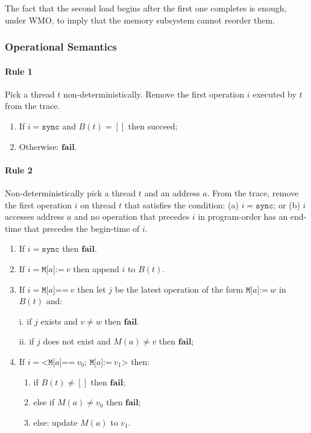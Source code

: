 \documentclass[11pt]{article}
\begin{document}
\noindent The fact that the second load begins after the first one
completes is enough, under WMO, to imply that the memory subsystem
cannot reorder them.

\subsubsection*{Operational Semantics}

\paragraph{Rule 1} 

Pick a thread $t$ non-deterministically.  Remove the first operation
$i$ executed by $t$ from the trace.

\begin{enumerate}
\item
     If $i = \texttt{sync}$ and $B(t) = []$ then succeed;
\item
     Otherwise: $\textbf{fail}$.
\end{enumerate}

\paragraph{Rule 2}

Non-deterministically pick a thread $t$ and an address $a$.  From the
trace, remove the first operation $i$ on thread $t$ that satisfies the
condition: (a) $i = \texttt{sync}$; or (b) $i$ accesses address $a$
and no operation that precedes $i$ in program-order has an end-time
that precedes the begin-time of $i$.

\begin{enumerate}
\item 
     If $i = \texttt{sync}$ then $\textbf{fail}$.

\item 
     If $i = \texttt{M[}a\texttt{]:=}~v$ then append $i$ to $B(t)$.

\item 
     If $i = \texttt{M[}a\texttt{]==}~v$ then let $j$ be the latest
     operation of the form $\texttt{M[}a\texttt{]:=}~w$ in
     $B(t)$ and:
     
       i.   if $j$ exists and $v \neq w$ then $\textbf{fail}$.

       ii.  if $j$ does not exist and $M(a) \neq v$ then $\textbf{fail}$;

\item
     If $i = \texttt{<M[}a\texttt{]==}~v_0\texttt{; M[}a\texttt{]:=}~v_1
     \texttt{>}$ then:

\begin{enumerate}[i]
\item
           if $B(t) \neq []$ then $\textbf{fail}$;

\item
           else if $M(a) \neq v_0$ then $\textbf{fail}$;

\item
           else: update $M(a)$ to $v_1$.
\end{enumerate}
\end{enumerate}
\end{document}
